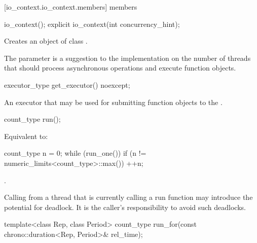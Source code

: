[io_context.io_context.members]{ members}

%
\begin{itemdecl}
io_context();
explicit io_context(int concurrency_hint);
\end{itemdecl}

\begin{itemdescr}
\pnum
\effects Creates an object of class .

\pnum
\remarks The  parameter is a suggestion to the implementation on the number of threads that should process asynchronous operations and execute function objects.
\end{itemdescr}

%
\begin{itemdecl}
executor_type get_executor() noexcept;
\end{itemdecl}

\begin{itemdescr}
\pnum
\returns An executor that may be used for submitting function objects to the .
\end{itemdescr}

%
\begin{itemdecl}
count_type run();
\end{itemdecl}

\begin{itemdescr}
\pnum
\effects Equivalent to:
\begin{codeblock}
count_type n = 0;
while (run_one())
  if (n != numeric_limits<count_type>::max())
    ++n;
\end{codeblock}

\pnum
\returns {}.

\pnum
\begin{note}
Calling  from a thread that is currently calling a run function
may introduce the potential for deadlock.
It is the caller's responsibility to avoid such deadlocks.
\end{note}
\end{itemdescr}

%
\begin{itemdecl}
template<class Rep, class Period>
  count_type run_for(const chrono::duration<Rep, Period>& rel_time);
\end{itemdecl}

